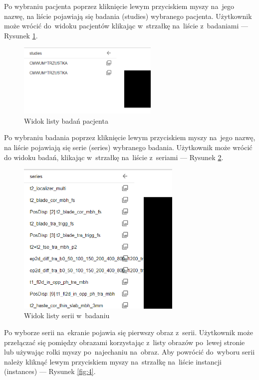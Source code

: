 \documentclass[a4paper,11pt,twoside,openright]{report}
\theoremstyle{definition}
\begin{document}
Po wybraniu pacjenta poprzez kliknięcie lewym przyciskiem myszy na~jego nazwę,
na liście pojawiają się badania (studies) wybranego pacjenta. Użytkownik może
wrócić do~widoku pacjentów klikając w~strzałkę na~liście z~badaniami --- Rysunek \ref{fig:2}.

\begin{figure}[h!]
	\center
	\includegraphics[width=0.6\textwidth]{2}
	\caption{Widok listy badań pacjenta}
    	\label{fig:2}
\end{figure}

\pagebreak

Po wybraniu badania poprzez kliknięcie lewym przyciskiem myszy na~jego nazwę,
na liście pojawiają się serie (series) wybranego badania. Użytkownik może wrócić
do widoku badań, klikając w~strzałkę na~liście z~seriami --- Rysunek \ref{fig:3}.

\begin{figure}[h!]
	\center
	\includegraphics[width=0.7\textwidth]{3}
	\caption{Widok listy serii w~badaniu}
    	\label{fig:3}
\end{figure}

Po wyborze serii na~ekranie pojawia się pierwszy obraz z~serii. Użytkownik
może przełączać się pomiędzy obrazami korzystając z~listy obrazów po~lewej
stronie lub używając rolki myszy po~najechaniu na~obraz. Aby powrócić do~wyboru
serii należy kliknąć lewym przyciskiem myszy na~strzałkę na~liście instancji
(instances) --- Rysunek \ref{fig:4}.
\end{document}
